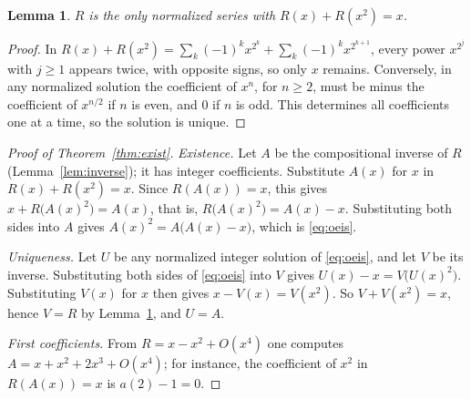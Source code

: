 \documentclass[11pt,a4paper]{article}
\newtheorem{lemma}[theorem]{Lemma}
\theoremstyle{definition}
\theoremstyle{remark}
\begin{document}
\begin{lemma}\label{lem:R}
$R$ is the only normalized series with $R(x)+R(x^2)=x$.
\end{lemma}

\begin{proof}
In $R(x)+R(x^2)=\sum_k(-1)^kx^{2^k}+\sum_k(-1)^kx^{2^{k+1}}$, every power $x^{2^j}$ with $j\ge1$ appears twice, with
opposite signs, so only $x$ remains. Conversely, in any normalized solution the coefficient of $x^n$, for $n\ge2$, must
be minus the coefficient of $x^{n/2}$ if $n$ is even, and $0$ if $n$ is odd. This determines all coefficients one at a
time, so the solution is unique.
\end{proof}

\begin{proof}[Proof of Theorem~\ref{thm:exist}]
\emph{Existence.} Let $A$ be the compositional inverse of $R$ (Lemma~\ref{lem:inverse}); it has integer coefficients.
Substitute $A(x)$ for $x$ in $R(x)+R(x^2)=x$. Since $R(A(x))=x$, this gives $x+R\bigl(A(x)^2\bigr)=A(x)$, that is,
$R\bigl(A(x)^2\bigr)=A(x)-x$. Substituting both sides into $A$ gives $A(x)^2=A\bigl(A(x)-x\bigr)$, which is
\eqref{eq:oeis}.

\emph{Uniqueness.} Let $U$ be any normalized integer solution of \eqref{eq:oeis}, and let $V$ be its inverse.
Substituting both sides of \eqref{eq:oeis} into $V$ gives $U(x)-x=V\bigl(U(x)^2\bigr)$. Substituting $V(x)$ for $x$
then gives $x-V(x)=V(x^2)$. So $V+V(x^2)=x$, hence $V=R$ by Lemma~\ref{lem:R}, and $U=A$.

\emph{First coefficients.} From $R=x-x^2+O(x^4)$ one computes $A=x+x^2+2x^3+O(x^4)$; for instance, the coefficient
of $x^2$ in $R(A(x))=x$ is $a(2)-1=0$.
\end{proof}
\end{document}
